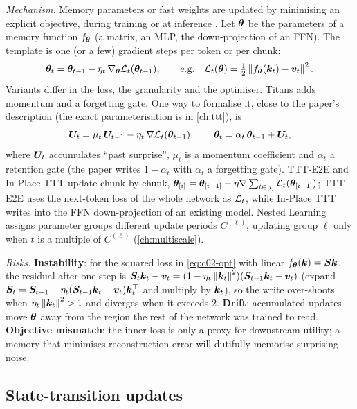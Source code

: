 \emph{Mechanism.} Memory parameters or fast weights are updated by minimising an explicit
objective, during training or at inference \citep[Table II]{zhoubian2026memory}. Let $\bm{\theta}$ be
the parameters of a memory function $f_{\bm{\theta}}$ (a matrix, an MLP, the down-projection of an
FFN). The template is one (or a few) gradient steps per token or per chunk:
\begin{equation}\label{eq:c02-opt}
  \bm{\theta}_t = \bm{\theta}_{t-1} - \eta_t\,\nabla_{\bm{\theta}}\mathcal{L}_t(\bm{\theta}_{t-1}),
  \qquad\text{e.g.}\quad
  \mathcal{L}_t(\bm{\theta}) = \tfrac12\left\lVert f_{\bm{\theta}}(\bm{k}_t) - \bm{v}_t\right\rVert^2 .
\end{equation}
Variants differ in the loss, the granularity and the optimiser. Titans adds momentum and a
forgetting gate. One way to formalise it, close to the paper's description (the exact
parameterisation is in \cref{ch:ttt}), is
\begin{equation}\label{eq:c02-titans}
  \bm{U}_t = \mu_t\,\bm{U}_{t-1} - \eta_t\,\nabla\mathcal{L}_t(\bm{\theta}_{t-1}), \qquad
  \bm{\theta}_t = \alpha_t\,\bm{\theta}_{t-1} + \bm{U}_t ,
\end{equation}
where $\bm{U}_t$ accumulates ``past surprise'', $\mu_t$ is a momentum coefficient and $\alpha_t$ a
retention gate (the paper writes $1-\alpha_t$ with $\alpha_t$ a forgetting gate). TTT-E2E and
In-Place TTT update chunk by chunk,
$\bm{\theta}_{[i]} = \bm{\theta}_{[i-1]} - \eta\nabla\sum_{t\in[i]}\mathcal{L}_t(\bm{\theta}_{[i-1]})$; TTT-E2E uses
the next-token loss of the whole network as $\mathcal{L}_t$, while In-Place TTT writes into the FFN
down-projection of an existing model. Nested Learning assigns parameter groups different update
periods $C^{(\ell)}$, updating group $\ell$ only when $t$ is a multiple of $C^{(\ell)}$
(\cref{ch:multiscale}).

\emph{Risks.} \textbf{Instability}: for the squared loss in \eqref{eq:c02-opt} with linear
$f_{\bm{\theta}}(\bm{k}) = \bm{S}\bm{k}$, the residual after one step is
$\bm{S}_t\bm{k}_t - \bm{v}_t = (1 - \eta_t\left\lVert \bm{k}_t\right\rVert^2)(\bm{S}_{t-1}\bm{k}_t - \bm{v}_t)$ (expand
$\bm{S}_t = \bm{S}_{t-1} - \eta_t(\bm{S}_{t-1}\bm{k}_t - \bm{v}_t)\bm{k}_t^{\top}$ and multiply by $\bm{k}_t$), so the write
over-shoots when $\eta_t\left\lVert \bm{k}_t\right\rVert^2 > 1$ and diverges when it exceeds $2$. \textbf{Drift}:
accumulated updates move $\bm{\theta}$ away from the region the rest of the network was trained to
read. \textbf{Objective mismatch}: the inner loss is only a proxy for downstream utility; a memory
that minimises reconstruction error will dutifully memorise surprising noise.

\subsection{State-transition updates}\label{sec:c02-rule-transition}

